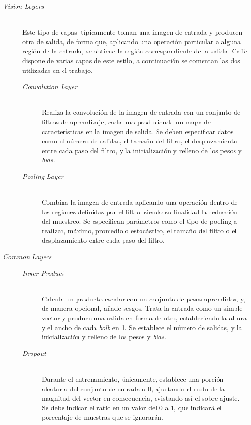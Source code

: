 \begin{description}
\item[\textit{Vision Layers}] \hfill 
\vspace{10pt}
\\
	Este tipo de capas, típicamente toman una imagen de entrada y producen otra de salida, de forma que, aplicando una operación particular a alguna región de la entrada, se obtiene la región correspondiente de la salida. Caffe dispone de varias capas de este estilo, a continuación se comentan las dos utilizadas en el trabajo.
	\vspace{10pt}
	\begin{description}
	\item[\textit{Convolution Layer}] \hfill 
	\vspace{5pt}
	\\
		Realiza la convolución de la imagen de entrada con un conjunto de filtros de aprendizaje, cada uno produciendo un mapa de características en la imagen de salida. Se deben especificar datos como el número de salidas, el tamaño del filtro, el desplazamiento entre cada paso del filtro, y la inicialización y relleno de los pesos y \textit{bias}.
		\vspace{10pt}
	\item[\textit{Pooling Layer}] \hfill 
	\vspace{5pt}
	\\
		Combina la imagen de entrada aplicando una operación dentro de las regiones definidas por el filtro, siendo su finalidad la reducción del muestreo. Se especifican parámetros como el tipo de pooling a realizar, máximo, promedio o estocástico, el tamaño del filtro o el desplazamiento entre cada paso del filtro.
	\end{description}

\item[\textit{Common Layers}] \hfill
	\begin{description}
	\item[\textit{Inner Product}] \hfill 
	\vspace{5pt}
	\\
	Calcula un producto escalar con un conjunto de pesos aprendidos, y, de manera opcional, añade sesgos. Trata la entrada como un simple vector y produce una salida en forma de otro, estableciendo la altura y el ancho de cada \textit{bolb} en 1. Se establece el número de salidas, y la inicialización y relleno de los pesos y \textit{bias}.
	\vspace{10pt}
	\item[\textit{Dropout}] \hfill 
	\vspace{5pt}
	\\
	Durante el entrenamiento, únicamente, establece una porción aleatoria del conjunto de entrada a 0, ajustando el resto de la magnitud del vector en consecuencia, evistando así el sobre ajuste. Se debe indicar el ratio en un valor del 0 a 1, que indicará el porcentaje de muestras que se ignorarán.
	\end{description}


\end{description}
